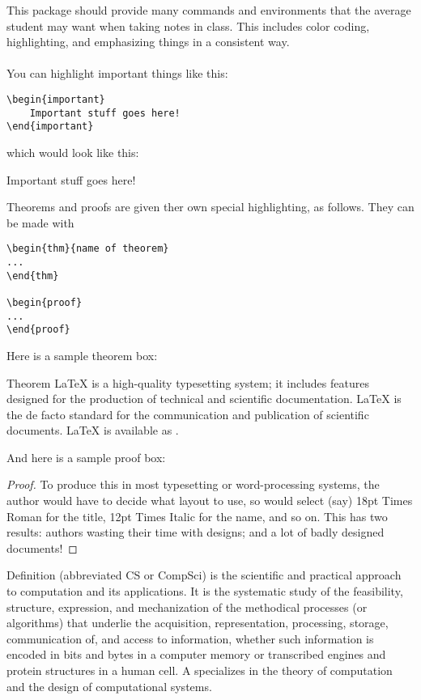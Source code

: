 \documentclass[10pt, letterpaper]{notes}
\date{\today}
\begin{document}
This package should provide many commands and environments that the average student may want when taking notes in class. This includes color coding, highlighting, and emphasizing things in a consistent way.
\\
\\
You can highlight important things like this:

\begin{verbatim}
\begin{important}
    Important stuff goes here!
\end{important}
\end{verbatim}

which would look like this:

\begin{important}
    Important stuff goes here!
\end{important}
Theorems and proofs are given ther own special highlighting, as follows. They can be made with
\begin{verbatim}
\begin{thm}{name of theorem}
...
\end{thm}

\begin{proof}
...
\end{proof}
\end{verbatim}
Here is a sample theorem box:
\begin{thm}{Theorem}
\LaTeX{} is a high-quality typesetting system; it includes features designed for the production of technical and scientific documentation. \LaTeX{} is the de facto standard for the communication and publication of scientific documents. \LaTeX{} is available as . 
\end{thm}
And here is a sample proof box:
\begin{proof}
To produce this in most typesetting or word-processing systems, the author would have to decide what layout to use, so would select (say) 18pt Times Roman for the title, 12pt Times Italic for the name, and so on. This has two results: authors wasting their time with designs; and a lot of badly designed documents! 
\end{proof}

\begin{definition}{Definition}
 (abbreviated CS or CompSci) is the scientific and practical approach to computation and its applications. It is the systematic study of the feasibility, structure, expression, and mechanization of the methodical processes (or algorithms) that underlie the acquisition, representation, processing, storage, communication of, and access to information, whether such information is encoded in bits and bytes in a computer memory or transcribed engines and protein structures in a human cell. A  specializes in the theory of computation and the design of computational systems.
\end{definition}
\end{document}
